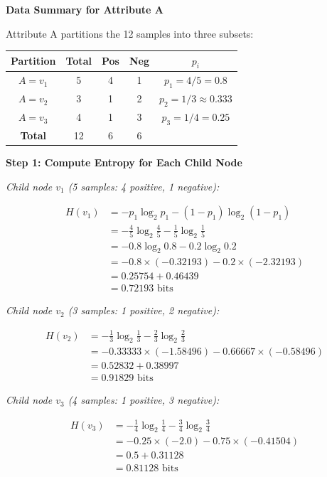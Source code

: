 \documentclass[12pt]{article}
\begin{document}
\begin{solution}
\textbf{Data Summary for Attribute A}

Attribute A partitions the 12 samples into three subsets:

\begin{center}
\begin{tabular}{|c|c|c|c|c|}
\hline
\textbf{Partition} & \textbf{Total} & \textbf{Pos} & \textbf{Neg} & \textbf{$p_i$} \\
\hline
$A = v_1$ & 5 & 4 & 1 & $p_1 = 4/5 = 0.8$ \\
$A = v_2$ & 3 & 1 & 2 & $p_2 = 1/3 \approx 0.333$ \\
$A = v_3$ & 4 & 1 & 3 & $p_3 = 1/4 = 0.25$ \\
\hline
\textbf{Total} & 12 & 6 & 6 & \\
\hline
\end{tabular}
\end{center}

\textbf{Step 1: Compute Entropy for Each Child Node}

\textit{Child node $v_1$ (5 samples: 4 positive, 1 negative):}

\begin{align*}
H(v_1) &= -p_1 \log_2 p_1 - (1-p_1) \log_2(1-p_1) \\
&= -\frac{4}{5} \log_2 \frac{4}{5} - \frac{1}{5} \log_2 \frac{1}{5} \\
&= -0.8 \log_2 0.8 - 0.2 \log_2 0.2 \\
&= -0.8 \times (-0.32193) - 0.2 \times (-2.32193) \\
&= 0.25754 + 0.46439 \\
&= 0.72193 \text{ bits}
\end{align*}

\textit{Child node $v_2$ (3 samples: 1 positive, 2 negative):}

\begin{align*}
H(v_2) &= -\frac{1}{3} \log_2 \frac{1}{3} - \frac{2}{3} \log_2 \frac{2}{3} \\
&= -0.33333 \times (-1.58496) - 0.66667 \times (-0.58496) \\
&= 0.52832 + 0.38997 \\
&= 0.91829 \text{ bits}
\end{align*}

\textit{Child node $v_3$ (4 samples: 1 positive, 3 negative):}

\begin{align*}
H(v_3) &= -\frac{1}{4} \log_2 \frac{1}{4} - \frac{3}{4} \log_2 \frac{3}{4} \\
&= -0.25 \times (-2.0) - 0.75 \times (-0.41504) \\
&= 0.5 + 0.31128 \\
&= 0.81128 \text{ bits}
\end{align*}


\end{solution}
\end{document}
